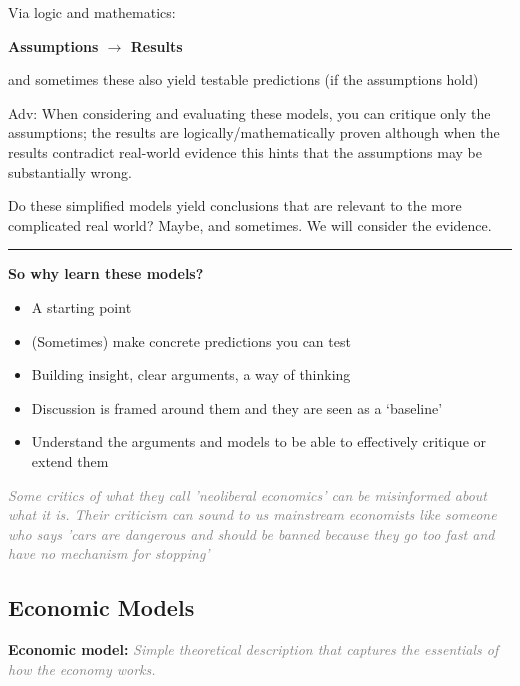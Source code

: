 \documentclass[]{article}
\begin{document}
Via logic and mathematics:

\textbf{Assumptions \(\rightarrow\) Results}\\

\bigskip

and sometimes these also yield testable predictions (if the assumptions
hold)

\bigskip

\textcolor{RawSienna}{Adv: When considering and evaluating these models, you can critique only the assumptions;
the results are logically/mathematically proven although when the results contradict real-world evidence this hints that the assumptions may be substantially wrong.}

Do these simplified models yield conclusions that are relevant to the
more complicated real world? Maybe, and sometimes. We will consider the
evidence.

\begin{center}\rule{0.5\linewidth}{\linethickness}\end{center}

\textbf{So why learn these models?}

\begin{itemize}
\item
  A starting point
\item
  (Sometimes) make concrete predictions you can test
\item
  Building insight, clear arguments, a way of thinking
\item
  Discussion is framed around them and they are seen as a `baseline'
\item
  Understand the arguments and models to be able to effectively critique
  or extend them
\end{itemize}

\emph{\textcolor{gray}{Some critics of what they call 'neoliberal economics' can be misinformed about what it is. Their criticism can sound to us mainstream economists like someone who says 'cars are dangerous and should be banned because they go too fast and have no mechanism for stopping'}}

\hypertarget{economic-models}{%
\subsection{Economic Models}\label{economic-models}}

\textbf{Economic model:}
\emph{\textcolor{gray}{Simple theoretical description that captures the essentials of how the economy works.}}
\end{document}
